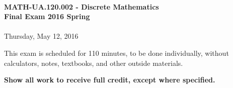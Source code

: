 \documentclass[12pt]{article}
\begin{document}
\thispagestyle{firststyle}
~
\vspace{0.5cm}

\begin{center}
\textbf{\Large MATH-UA.120.002 - Discrete Mathematics \\ \vspace{0.5cm} Final Exam 2016 Spring}\\~\\
Thursday, May 12, 2016
\end{center}

\vspace{1cm}


\vspace{1cm}

\noindent
This exam is scheduled for 110 minutes, to be done individually, without calculators, notes, textbooks, and other outside materials.
\vspace{0.5cm}

\noindent
\textbf{Show all work to receive full credit, except where specified.}

\vspace{1cm}
\end{document}
